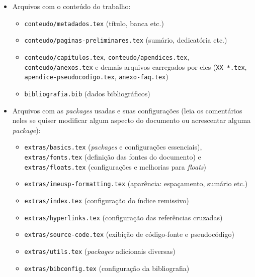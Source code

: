 \begin{itemize}
  \item Arquivos com o conteúdo do trabalho:
  \begin{itemize}
    \item \texttt{conteudo/metadados.tex} (título, banca etc.)
    \item \texttt{conteudo/paginas-preliminares.tex} (sumário, dedicatória etc.)
    \item \texttt{conteudo/capitulos.tex}, \texttt{conteudo/apendices.tex},
          \texttt{conteudo/anexos.tex} e demais arquivos carregados por eles
          (\texttt{XX-*.tex}, \texttt{apendice-pseudocodigo.tex}, \texttt{anexo-faq.tex})
    \item \texttt{bibliografia.bib} (dados bibliográficos)
  \end{itemize}

  \item Arquivos com as \textit{packages} usadas e suas configurações (leia
        os comentários neles se quiser modificar algum aspecto do
        documento ou acrescentar alguma \textit{package}):
  \begin{itemize}
    \item \texttt{extras/basics.tex} (\textit{packages} e configurações essenciais),
          \texttt{extras/fonts.tex} (definição das fontes do documento) e
          \texttt{extras/floats.tex} (configurações e melhorias para \textit{floats})
    \item \texttt{extras/imeusp-formatting.tex} (aparência: espaçamento, sumário etc.)
    \item \texttt{extras/index.tex} (configuração do índice remissivo)
    \item \texttt{extras/hyperlinks.tex} (configuração das referências cruzadas)
    \item \texttt{extras/source-code.tex} (exibição de código-fonte e pseudocódigo)
    \item \texttt{extras/utils.tex} (\textit{packages} adicionais diversas)
    \item \texttt{extras/bibconfig.tex} (configuração da bibliografia)
  \end{itemize}


\end{itemize}

